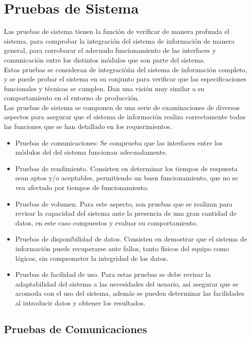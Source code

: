 \section{Pruebas de Sistema}{
\noindent Las pruebas de sistema tienen la función de verificar de manera profunda el sistema, para comprobar  la integración del sistema de información de manera general, para corroborar el adecuado funcionamiento de las interfaces y comunicación entre los distintos módulos que son parte del sistema.\\

\noindent Estas pruebas se consideran de integracióńn del sistema de información completo, y se puede probar el sistema en su conjunto para verificar que las especificaciones funcionales y técnicas se cumplen. Dan una visión muy similar a su comportamiento en el entorno de producción.\\

\noindent Las pruebas de sistema se componen de una serie de examinaciones de diversos aspectos para asegurar que el sistema de información realiza correctamente todas las funciones que se han detallado en los requerimientos.

\begin{itemize}
    \item Pruebas de comunicaciones: Se comprueba  que las interfaces entre los módulos del  del sistema funcionan adecuadamente.
    \item Pruebas de rendimiento. Consisten en determinar los tiempos de respuesta sean aptos y/o aceptables, permitiendo un buen funcionamiento, que no se vea afectado por tiempos de funcionamiento.
    \item Pruebas de volumen. Para este aspecto, son pruebas que se realizan para revisar la capacidad del sistema ante la presencia de una gran cantidad de datos, en este caso compuestos y evaluar su comportamiento.
    \item Pruebas de disponibilidad de datos. Consisten en demostrar que el sistema de información  puede recuperarse ante fallos, tanto físicos del equipo como lógicos, sin comprometer la integridad de los datos.
    \item Pruebas de facilidad de uso. Para estas pruebas se debe revisar  la adaptabilidad del sistema a las necesidades del usuario, así asegurar que se acomoda con el uso del sistema, además se pueden determinar las facilidades  al introducir datos y obtener los resultados.
\end{itemize}
\newpage
\subsection{Pruebas de Comunicaciones}



}
